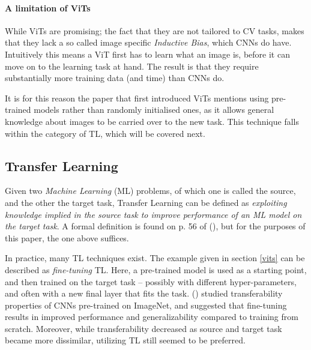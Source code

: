 \paragraph{A limitation of ViTs}
While ViTs are promising; the fact that they are not tailored to CV tasks, makes that they lack a so called image specific \textit{Inductive Bias}, which CNNs do have. Intuitively this means a ViT first has to learn what an image is, before it can move on to the learning task at hand. The result is that they require substantially more training data (and time) than CNNs do. 

It is for this reason the paper that first introduced ViTs \citep{dosovitskiy2020image} mentions using pre-trained models rather than randomly initialised ones, as it allows general knowledge about images to be carried over to the new task. This technique falls within the category of TL, which will be covered next.


\subsection{Transfer Learning}
Given two \textit{Machine Learning} (ML) problems, of which one is called the source, and the other the target task, Transfer Learning can be defined as \textit{exploiting knowledge implied in the source task to improve performance of an ML model on the target task}. A formal definition is found on p. 56 of \citeauthor{sabatelli2022contributions} (\citeyear{sabatelli2022contributions}), but for the purposes of this paper, the one above suffices.

In practice, many TL techniques exist. The example given in section \ref{vits} can be described as \textit{fine-tuning} TL. Here, a pre-trained model is used as a starting point, and then trained on the target task -- possibly with different hyper-parameters, and often with a new final layer that fits the task. \citeauthor{yosinski2014transferable} (\citeyear{yosinski2014transferable}) studied transferability properties of CNNs pre-trained on ImageNet, and suggested that fine-tuning results in improved performance and generalizability compared to training from scratch. Moreover, while transferability decreased as source and target task became more dissimilar, utilizing TL still seemed to be preferred.


